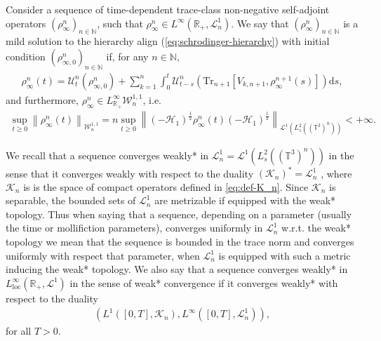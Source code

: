 \begin{defi}\label{def-mildsol-bbgky}
Consider a sequence of time-dependent trace-class non-negative self-adjoint operators $(\rho_{\infty}^n)_{n \in \mathbb{N}}$,
  such that $\rho^n_{\infty} \in L^{\infty} (\mathbb{R}_+, \mathcal{L}^1_n)$.
  We say that $(\rho_{\infty}^n)_{n \in \mathbb{N}}$ is a mild
  solution to the hierarchy align (\ref{eq:schrodinger-hierarchy}) with
  initial condition $(\rho^n_{\infty, 0})_{n \in \mathbb{N}}$ if, for any $n
  \in \mathbb{N}$,
  \begin{align}
    \rho^n_{\infty} (t) = \mathcal{U}^n_t (\rho^n_{\infty, 0}) + \sum_{k =
    1}^n \int^t_0 \mathcal{U}^n_{t - s} \left(\mathrm{Tr}_{n + 1} \left[V_{k, n + 1},
    \rho^{n + 1}_{\infty} (s)\right]\right) \mathrm{d}s, \label{eq:MB-bbgky-mild}
  \end{align}
  and furthermore, $\rho^n_{\infty} \in L_{\mathbb{R}_+}^{\infty}
  \mathcal{W}^{1, 1}_n$, i.e.
  \begin{align}
    \sup_{t \geqslant 0} \left\| \rho_{\infty}^n (t) \right\|_{\mathcal{W}_n^{1, 1}} = n
    \sup_{t \geqslant 0} \left\| (- \mathcal{H}_{1})^{\frac{1}{2}} \rho_{\infty}^n (t)
    (- \mathcal{H}_{1})^{\frac{1}{2}}\right \|_{\mathcal{L}^1 (L_s^2
    ((\mathbb{T}^3)^n))} < + \infty .
  \end{align}
\end{defi}

\begin{nota*}
  We recall that a sequence converges weakly* in $\mathcal{L}^1_n =
  \mathcal{L}^1 (L_s^2 ((\mathbb{T}^3)^n))$ in the sense that it converges
  weakly with respect to the duality $(\mathcal{K}_n)^{\ast} =
  \mathcal{L}_n^1$ , where $\mathcal{K}_n$ is is the space of compact operators defined in \eqref{eq:def-K_n}. Since $\mathcal{K}_n$ is separable, the bounded sets of $\mathcal{L}^1_n$
  are metrizable if equipped with the weak* topology. Thus when saying that a
  sequence, depending on a parameter (usually the time or mollifiction
  parameters), converges uniformly in $\mathcal{L}^1_n$ w.r.t. the
  weak* topology we mean that the sequence is bounded in the trace norm and
  converges uniformly with respect that parameter, when $\mathcal{L}^1_n$ is
  equipped with such a metric inducing the weak* topology. We also say that a sequence converges weakly* in $L^{\infty}_{\mathrm{loc}}
  (\mathbb{R}_+, \mathcal{L}^1)$ in the sense of weak* convergence if it
  converges weakly* with respect to the duality
  \begin{align}\label{eq:dualitylinfty}
    (L^1 ([0, T], \mathcal{K}_n), L^{\infty} ([0, T], \mathcal{L}_n^1)),
  \end{align}
  for all $T > 0$.
\end{nota*}

